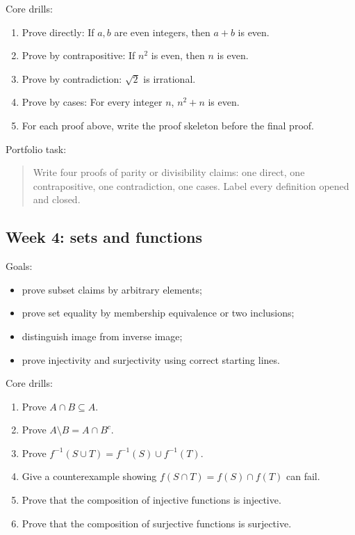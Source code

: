 Core drills:

\begin{enumerate}
\item Prove directly: If $a,b$ are even integers, then $a+b$ is even.
\item Prove by contrapositive: If $n^2$ is even, then $n$ is even.
\item Prove by contradiction: $\sqrt2$ is irrational.
\item Prove by cases: For every integer $n$, $n^2+n$ is even.
\item For each proof above, write the proof skeleton before the final proof.
\end{enumerate}

Portfolio task:

\begin{quote}
Write four proofs of parity or divisibility claims: one direct, one contrapositive, one contradiction, one cases. Label every definition opened and closed.
\end{quote}

\subsection{Week 4: sets and functions}

Goals:

\begin{itemize}
\item prove subset claims by arbitrary elements;
\item prove set equality by membership equivalence or two inclusions;
\item distinguish image from inverse image;
\item prove injectivity and surjectivity using correct starting lines.
\end{itemize}

Core drills:

\begin{enumerate}
\item Prove $A\cap B\subseteq A$.
\item Prove $A\setminus B=A\cap B^c$.
\item Prove $f^{-1}(S\cup T)=f^{-1}(S)\cup f^{-1}(T)$.
\item Give a counterexample showing $f(S\cap T)=f(S)\cap f(T)$ can fail.
\item Prove that the composition of injective functions is injective.
\item Prove that the composition of surjective functions is surjective.
\end{enumerate}

